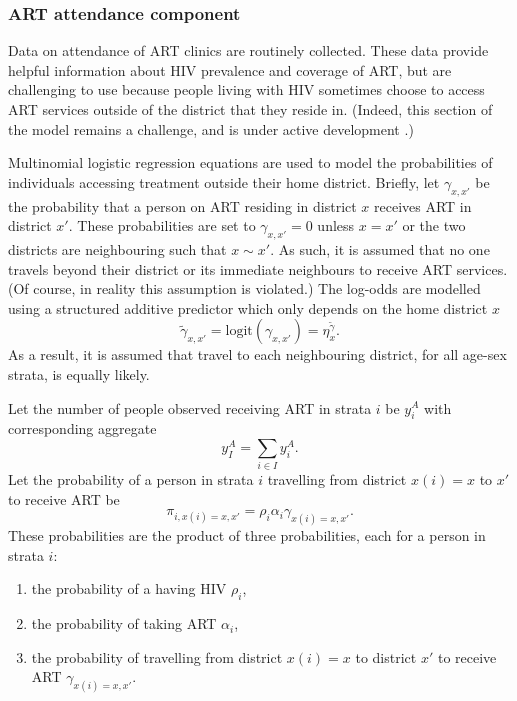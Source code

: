 \documentclass[a4paper, nobind]{templates/ociamthesis}
\providecommand{\tightlist}{%
  \setlength{\itemsep}{0pt}\setlength{\parskip}{0pt}}
\begin{document}
\hypertarget{art}{%
\subsubsection{ART attendance component}\label{art}}

Data on attendance of ART clinics are routinely collected.
These data provide helpful information about HIV prevalence and coverage of ART, but are challenging to use because people living with HIV sometimes choose to access ART services outside of the district that they reside in.
(Indeed, this section of the model remains a challenge, and is under active development \autocite{esra2023improved}.)

Multinomial logistic regression equations are used to model the probabilities of individuals accessing treatment outside their home district.
Briefly, let \(\gamma_{x, x'}\) be the probability that a person on ART residing in district \(x\) receives ART in district \(x'\).
These probabilities are set to \(\gamma_{x, x'} = 0\) unless \(x = x'\) or the two districts are neighbouring such that \(x \sim x'\).
As such, it is assumed that no one travels beyond their district or its immediate neighbours to receive ART services.
(Of course, in reality this assumption is violated.)
The log-odds are modelled using a structured additive predictor which only depends on the home district \(x\)
\begin{equation}
\tilde \gamma_{x, x'} = \text{logit}(\gamma_{x, x'}) = \eta_{x}^{\tilde \gamma}.
\end{equation}
As a result, it is assumed that travel to each neighbouring district, for all age-sex strata, is equally likely.

Let the number of people observed receiving ART in strata \(i\) be \(y^{A}_i\) with corresponding aggregate
\begin{equation}
y^{A}_I = \sum_{i \in I} y^{A}_i. \label{eq:art-aggregate}
\end{equation}
Let the probability of a person in strata \(i\) travelling from district \(x(i) = x\) to \(x'\) to receive ART be
\begin{equation}
\pi_{i, x(i) = x, x'} = \rho_{i} \alpha_{i} \gamma_{x(i) = x, x'}. \label{eq:recieve-art}
\end{equation}
These probabilities are the product of three probabilities, each for a person in strata \(i\):

\begin{enumerate}
\def\labelenumi{\arabic{enumi}.}
\tightlist
\item
  the probability of a having HIV \(\rho_{i}\),
\item
  the probability of taking ART \(\alpha_{i}\),
\item
  the probability of travelling from district \(x(i) = x\) to district \(x'\) to receive ART \(\gamma_{x(i) = x, x'}\).
\end{enumerate}
\end{document}
